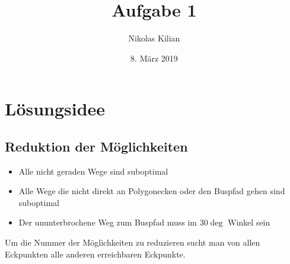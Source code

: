 \documentclass[12pt]{article}
\title{\vspace{-2.0cm}Aufgabe 1}
\author{Nikolas Kilian}
\date{8. März 2019}
\begin{document}
\maketitle

\section{Lösungsidee}
\subsection{Reduktion der Möglichkeiten}
\begin{itemize}
\item Alle nicht geraden Wege sind suboptimal\\
\item Alle Wege die nicht direkt an Polygonecken oder den Buspfad gehen sind suboptimal\\
\item Der ununterbrochene Weg zum Buspfad muss im 30$\deg$ Winkel sein\\
\end{itemize}
Um die Nummer der Möglichkeiten zu reduzieren sucht man von allen Eckpunkten alle anderen erreichbaren Eckpunkte. 
\end{document}
